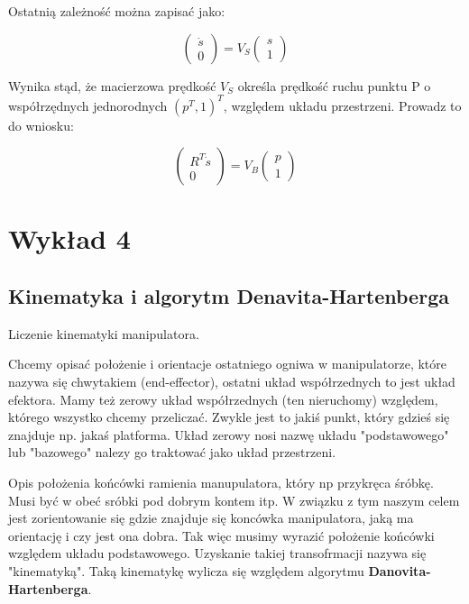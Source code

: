 \documentclass{article}
\begin{document}
Ostatnią zależność można zapisać jako:

$$
    \begin{pmatrix}
        \dot s \\[0.3em]
        0
    \end{pmatrix}
    =V_{S}
    \begin{pmatrix}
        s \\[0.3em]
        1
    \end{pmatrix}
$$

Wynika stąd, że macierzowa prędkość $V_{S}$ określa prędkość ruchu punktu P o współrzędnych jednorodnych $(p^{T}, 1)^{T}$, względem układu przestrzeni. Prowadz to do wniosku:

$$
    \begin{pmatrix}
        R^{T}\dot s \\[0.3em]
        0
    \end{pmatrix}
    =V_{B}
    \begin{pmatrix}
        p \\[0.3em]
        1
    \end{pmatrix}
$$


\newpage

\section{Wykład 4}

\subsection{Kinematyka i algorytm Denavita-Hartenberga}

Liczenie kinematyki manipulatora.

Chcemy opisać położenie i orientacje ostatniego ogniwa w manipulatorze, które nazywa się chwytakiem (end-effector), ostatni układ współrzednych to jest układ efektora. Mamy też zerowy układ współrzednych (ten nieruchomy) względem, którego wszystko chcemy przeliczać. Zwykle jest to jakiś punkt, który gdzieś się znajduje np. jakaś platforma. Układ zerowy nosi nazwę układu "podstawowego" lub "bazowego" nalezy go traktować jako układ przestrzeni.

Opis położenia końcówki ramienia manupulatora, który np przykręca śróbkę. Musi być w obeć sróbki pod dobrym kontem itp. W związku z tym naszym celem jest zorientowanie się gdzie znajduje się koncówka manipulatora, jaką ma orientację i czy jest ona dobra.
Tak więc musimy wyrazić położenie końcówki względem układu podstawowego. Uzyskanie takiej transofrmacji nazywa się "kinematyką".
Taką kinematykę wylicza się względem algorytmu {\bf Danovita-Hartenberga}.
\end{document}
